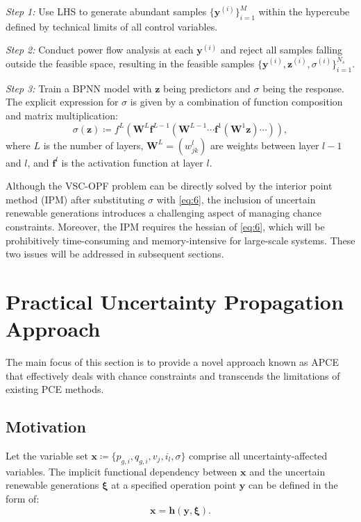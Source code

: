 \documentclass[journal]{IEEEtran}
\theoremstyle{definition}
\theoremstyle{remark}
\begin{document}
\textit{Step 1:} Use LHS to generate abundant samples $\{\boldsymbol{y}^{(i)}\}_{i=1}^{M}$ within the hypercube defined by technical limits of all control variables.

\textit{Step 2:} Conduct power flow analysis at each $\boldsymbol{y}^{(i)}$ and reject all samples falling outside the feasible space, resulting in the feasible samples $\{\boldsymbol{y}^{(i)},\boldsymbol{z}^{(i)},\sigma^{(i)}\}_{i=1}^{N_s}$.

\textit{Step 3:} Train a BPNN model with $\boldsymbol{z}$ being predictors and $\sigma$ being the response. The explicit expression for $\sigma$ is given by a combination of function composition and matrix multiplication:
\begin{equation}\label{eq:6}
        \sigma(\boldsymbol{z})\coloneqq f^{L}(\boldsymbol{W}^{L}\boldsymbol{f}^{L-1}(\boldsymbol{W}^{L-1}\cdots\boldsymbol{f}^{1}(\boldsymbol{W}^{1}\boldsymbol{z})\cdots)),
\end{equation}
where $L$ is the number of layers, $\boldsymbol{W}^{L}=(w_{jk}^l)$ are weights between layer $l-1$ and $l$, and $\boldsymbol{f}^l$ is the activation function at layer $l$.

Although the VSC-OPF problem can be directly solved by the interior point method (IPM) after substituting $\sigma$ with \eqref{eq:6}, the inclusion of uncertain renewable generations introduces a challenging aspect of managing chance constraints. Moreover, the IPM requires the hessian of \eqref{eq:6}, which will be prohibitively time-consuming and memory-intensive for large-scale systems. These two issues will be addressed in subsequent sections.
\section{Practical Uncertainty Propagation Approach}\label{approach}
The main focus of this section is to provide a novel approach known as APCE that effectively deals with chance constraints and transcends the limitations of existing PCE methods.   
\subsection{Motivation}
Let the variable set $\boldsymbol{x}\coloneqq\{p_{g,i},q_{g, i},v_j,i_l,\sigma\}$ comprise all uncertainty-affected variables. The implicit functional dependency between $\boldsymbol{x}$ and the uncertain renewable generations $\boldsymbol{\xi}$ at a specified operation point $\boldsymbol{y}$ can be defined in the form of:
\begin{equation}
    \boldsymbol{x}=\boldsymbol{h}(\boldsymbol{y},\boldsymbol{\xi}).
\end{equation}
\end{document}
